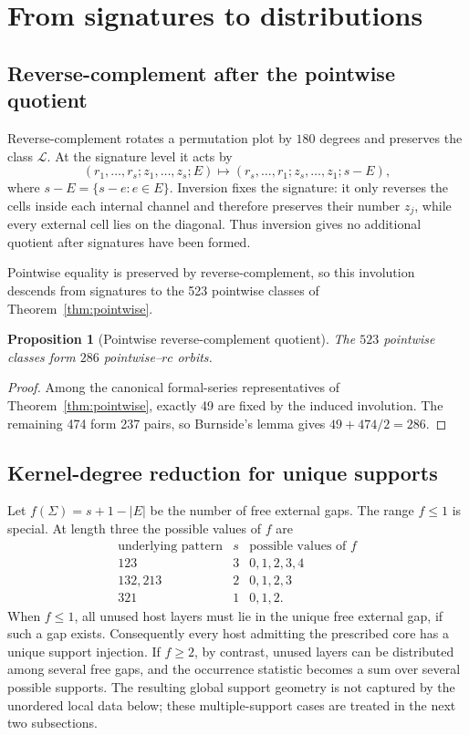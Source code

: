 \documentclass[12pt]{article}
\newtheorem{prop}[thm]{Proposition}
\newcommand{\cL}{\mathcal L}
\begin{document}
\section{From signatures to distributions}\label{sec:mechanisms}

\subsection{Reverse-complement after the pointwise quotient}

Reverse-complement rotates a permutation plot by $180$ degrees and preserves
the class $\cL$.  At the signature level it acts by
\[
(r_1,\ldots,r_s;z_1,\ldots,z_s;E)
\longmapsto
(r_s,\ldots,r_1;z_s,\ldots,z_1;s-E),
\]
where $s-E=\{s-e:e\in E\}$.  Inversion fixes the signature: it only reverses
the cells inside each internal channel and therefore preserves their number
$z_j$, while every external cell lies on the diagonal.  Thus inversion gives
no additional quotient after signatures have been formed.

Pointwise equality is preserved by reverse-complement, so this
involution descends from signatures to the 523 pointwise classes of
Theorem~\ref{thm:pointwise}.

\begin{prop}[Pointwise reverse-complement quotient]\label{prop:286}
The $523$ pointwise classes form $286$ pointwise--$rc$ orbits.
\end{prop}

\begin{proof}
Among the canonical formal-series representatives of
Theorem~\ref{thm:pointwise}, exactly 49 are fixed by the induced involution.
The remaining 474 form 237 pairs, so Burnside's lemma gives
$49+474/2=286$.
\end{proof}

\subsection{Kernel-degree reduction for unique supports}

Let $f(\Sigma)=s+1-|E|$ be the number of free external gaps.  The range
$f\le1$ is special.  At length three the possible values of $f$ are
\[
\begin{array}{c|c|c}
\text{underlying pattern}&s&\text{possible values of }f\\ \hline
123&3&0,1,2,3,4\\
132,213&2&0,1,2,3\\
321&1&0,1,2.
\end{array}
\]
When $f\le1$, all unused host layers must lie in the unique free external gap,
if such a gap exists.  Consequently every host admitting the prescribed core
has a unique support injection.  If $f\ge2$, by contrast, unused layers can be
distributed among several free gaps, and the occurrence statistic becomes a
sum over several possible supports.  The resulting global support geometry is
not captured by the unordered local data below; these multiple-support cases
are treated in the next two subsections.
\end{document}
